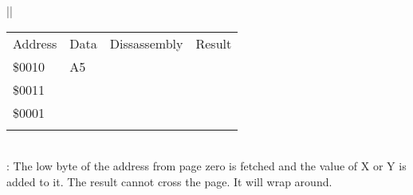 \documentclass[letterpaper,10pt,english]{sphinxmanual}
\begin{document}
\begin{savenotes}
\begin{tabular}[t]{|*{1}{|}}
\begin{savenotes}\sphinxattablestart
\sphinxthistablewithglobalstyle
\centering
\begin{tabulary}{\linewidth}[t]{|T|T|T|T|}
\sphinxtoprule
\sphinxstyletheadfamily 
\sphinxAtStartPar
Address
&\sphinxstyletheadfamily 
\sphinxAtStartPar
Data
&\sphinxstyletheadfamily 
\sphinxAtStartPar
Dissassembly
&\sphinxstyletheadfamily 
\sphinxAtStartPar
Result
\\
\sphinxmidrule
\sphinxtableatstartofbodyhook
\sphinxAtStartPar
\$0010
&
\sphinxAtStartPar
A5
&%
&%
\\
\sphinxAtStartPar
\$0011
&
&&\\
\sphinxAtStartPar
\$0001
&
&&\\
\sphinxbottomrule
\end{tabulary}
\sphinxtableafterendhook\par
\sphinxattableend\end{savenotes}
\\
\sphinxhline
\sphinxAtStartPar
{}: The low
byte of the address from page zero is fetched and the value of X or Y is
added to it. The result cannot cross the page. It will wrap around.

\sphinxAtStartPar
{}



\end{tabular}
\end{savenotes}
\end{document}

